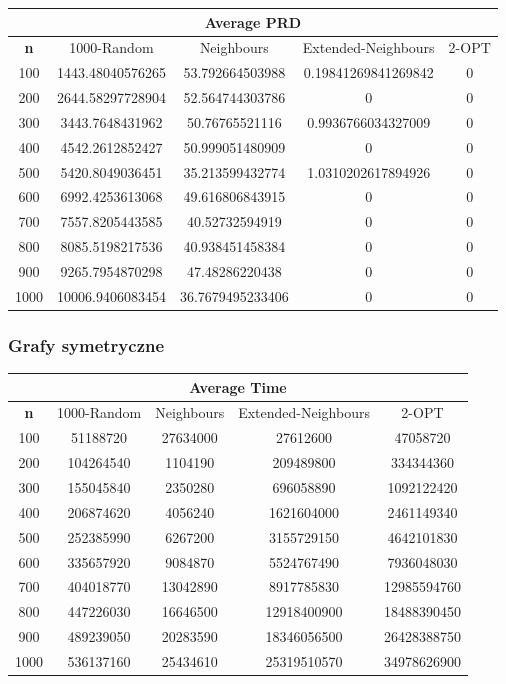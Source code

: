 \documentclass{article}
\begin{document}
\begin{center}
\begin{tabular}{|c|c|c|c|c|}
\hline
\multicolumn{5}{|c|}{\textbf{Average PRD}}\\
\hline
\textbf{n} & 1000-Random & Neighbours & Extended-Neighbours & 2-OPT\\
\hline
100 & 1443.48040576265 & 53.792664503988 & 0.19841269841269842 & 0\\
\hline
200 & 2644.58297728904 & 52.564744303786 & 0 & 0\\
\hline
300 & 3443.7648431962 & 50.76765521116 & 0.9936766034327009 & 0\\
\hline
400 & 4542.2612852427 & 50.999051480909 & 0 & 0\\
\hline
500 & 5420.8049036451 & 35.213599432774 & 1.0310202617894926 & 0\\
\hline
600 & 6992.4253613068 & 49.616806843915 & 0 & 0\\
\hline
700 & 7557.8205443585 & 40.52732594919 & 0 & 0\\
\hline
800 & 8085.5198217536 & 40.938451458384 & 0 & 0\\
\hline
900 & 9265.7954870298 & 47.48286220438 & 0 & 0\\
\hline
1000 & 10006.9406083454 & 36.7679495233406 & 0 & 0\\
\hline
\end{tabular}
\end{center}


\subsubsection{Grafy symetryczne}

\begin{center}
\begin{tabular}{|c|c|c|c|c|}
\hline
\multicolumn{5}{|c|}{\textbf{Average Time}}\\
\hline
\textbf{n} & 1000-Random & Neighbours & Extended-Neighbours & 2-OPT\\
\hline
100 & 51188720 & 27634000 & 27612600 & 47058720\\
\hline
200 & 104264540 & 1104190 & 209489800 & 334344360\\
\hline
300 & 155045840 & 2350280 & 696058890 & 1092122420\\
\hline
400 & 206874620 & 4056240 & 1621604000 & 2461149340\\
\hline
500 & 252385990 & 6267200 & 3155729150 & 4642101830\\
\hline
600 & 335657920 & 9084870 & 5524767490 & 7936048030\\
\hline
700 & 404018770 & 13042890 & 8917785830 & 12985594760\\
\hline
800 & 447226030 & 16646500 & 12918400900 & 18488390450\\
\hline
900 & 489239050 & 20283590 & 18346056500 & 26428388750\\
\hline
1000 & 536137160 & 25434610 & 25319510570 & 34978626900\\
\hline
\end{tabular}
\end{center}
\end{document}
